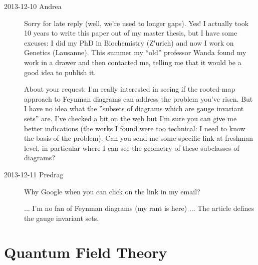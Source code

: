 \begin{description}
\item[2013-12-10   {Andrea}]
Sorry for late reply (well, we're used to longer gaps). Yes! I actually
took 10 years to write this paper out of my master thesis, but I have
some excuses: I did my PhD in Biochemistry (Z\''urich) and now I work on
Genetics (Lausanne). This summer my ``old'' professor Wanda
 found my work in a drawer
and then contacted me, telling me that it would be a good idea to publish
it.

About your request: I'm really interested in seeing if the rooted-map
approach to Feynman diagrams can address the problem you've risen. But I
have no idea what the ''subsets of diagrams which are gauge invariant
sets'' are. I've checked a bit on the web but I'm sure you can give me
better indications (the works I found were too technical: I need to know
the basis of the problem). Can you send me some specific link at freshman
level, in particular where I can see the geometry of these subclasses of
diagrams?

\item[2013-12-11  Predrag]
Why Google when you can click on the link in my email?

    ... I'm no fan of Feynman diagrams (my rant is
{here}) ... The article defines the gauge invariant sets.



\end{description}


\section{Quantum Field Theory}
\label{sect:QFT}

